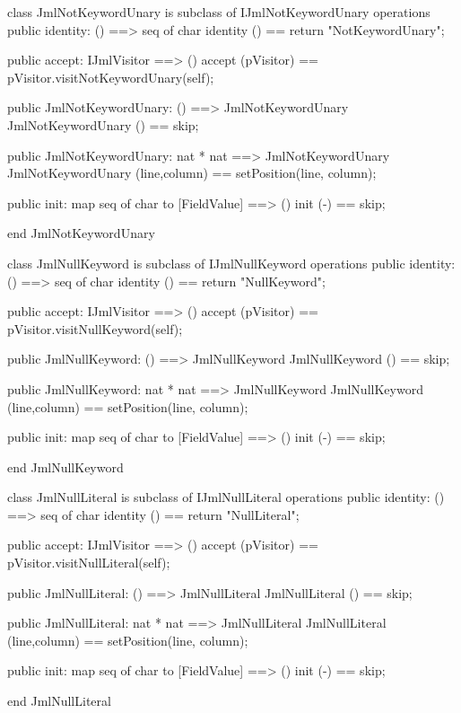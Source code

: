 \begin{vdm_al}
class JmlNotKeywordUnary is subclass of IJmlNotKeywordUnary
operations
  public identity: () ==> seq of char
  identity () == return "NotKeywordUnary";

  public accept: IJmlVisitor ==> ()
  accept (pVisitor) == pVisitor.visitNotKeywordUnary(self);

  public JmlNotKeywordUnary:
    () ==> JmlNotKeywordUnary
  JmlNotKeywordUnary () == 
    skip;

  public JmlNotKeywordUnary:
    nat *
    nat ==> JmlNotKeywordUnary
  JmlNotKeywordUnary (line,column) == 
    setPosition(line, column);

  public init: map seq of char to [FieldValue] ==> ()
  init (-) == skip;

end JmlNotKeywordUnary
\end{vdm_al}

\begin{vdm_al}
class JmlNullKeyword is subclass of IJmlNullKeyword
operations
  public identity: () ==> seq of char
  identity () == return "NullKeyword";

  public accept: IJmlVisitor ==> ()
  accept (pVisitor) == pVisitor.visitNullKeyword(self);

  public JmlNullKeyword:
    () ==> JmlNullKeyword
  JmlNullKeyword () == 
    skip;

  public JmlNullKeyword:
    nat *
    nat ==> JmlNullKeyword
  JmlNullKeyword (line,column) == 
    setPosition(line, column);

  public init: map seq of char to [FieldValue] ==> ()
  init (-) == skip;

end JmlNullKeyword
\end{vdm_al}

\begin{vdm_al}
class JmlNullLiteral is subclass of IJmlNullLiteral
operations
  public identity: () ==> seq of char
  identity () == return "NullLiteral";

  public accept: IJmlVisitor ==> ()
  accept (pVisitor) == pVisitor.visitNullLiteral(self);

  public JmlNullLiteral:
    () ==> JmlNullLiteral
  JmlNullLiteral () == 
    skip;

  public JmlNullLiteral:
    nat *
    nat ==> JmlNullLiteral
  JmlNullLiteral (line,column) == 
    setPosition(line, column);

  public init: map seq of char to [FieldValue] ==> ()
  init (-) == skip;

end JmlNullLiteral
\end{vdm_al}

